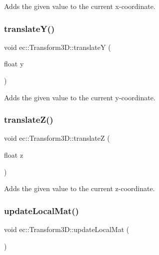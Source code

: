 Adds the given value to the current x-\/coordinate. \mbox{\label{classec_1_1_transform3_d_ab0c9d7ff73b744c480914b7d2aaabf81}} 
\subsubsection{\texorpdfstring{translate\+Y()}{translateY()}}
{\footnotesize\ttfamily void ec\+::\+Transform3\+D\+::translateY (\begin{DoxyParamCaption}\item[{float}]{y }\end{DoxyParamCaption})}

Adds the given value to the current y-\/coordinate. \mbox{\label{classec_1_1_transform3_d_a13ea4d1c69ec17c2ce4c1d8b4068639a}} 
\subsubsection{\texorpdfstring{translate\+Z()}{translateZ()}}
{\footnotesize\ttfamily void ec\+::\+Transform3\+D\+::translateZ (\begin{DoxyParamCaption}\item[{float}]{z }\end{DoxyParamCaption})}

Adds the given value to the current z-\/coordinate. \mbox{\label{classec_1_1_transform3_d_a68d259da063ea2aff48720ae55870445}} 
\subsubsection{\texorpdfstring{update\+Local\+Mat()}{updateLocalMat()}}
{\footnotesize\ttfamily void ec\+::\+Transform3\+D\+::update\+Local\+Mat (\begin{DoxyParamCaption}{ }\end{DoxyParamCaption})\hspace{0.3cm}{\ttfamily [virtual]}}

